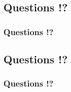 \documentclass{beamer}
\begin{document}
\def\titleSubSectionMorePart2{Questions !?}
\subsection*{\titleSubSectionMorePart2 }
\begin{frame}
	\frametitle{\titleSubSectionMorePart2 }
\end{frame} 

\def\titleSubSectionMorePart3{Questions !?}
\subsection*{\titleSubSectionMorePart3 }
\begin{frame}
	\frametitle{\titleSubSectionMorePart3 }
\end{frame} 
\end{document}
